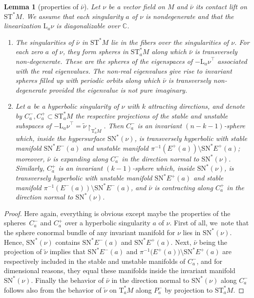 \documentclass[JEP,XML,SOM,Unicode]{cedram}
\newenvironment{enumeratea}
{\bgroup\def\theenumi{\alph{enumi}}\begin{enumerate}}
{\end{enumerate}\egroup}
\newcommand{\C}{{\mathbb C}}
\newcommand{\tu}[1]{\textup{#1}}
\newcommand{\sSN}{\mathrm{SN}^\ast}
\newcommand{\sT}{\mathrm{T}^\ast}
\newcommand{\sST}{\mathrm{ST}^\ast}
\newcommand{\hnu}{\tilde\nu}
\newcommand{\cnu}{\bar\nu}
\def\Lnu_#1{{\mathrm L_#1\nu}}
\newcommand{\rst}[1]{{\upharpoonright}_{\!#1}}
\theoremstyle{plain}
\newtheorem{lemma}[theorem]{Lemma}
\theoremstyle{definition}
\begin{document}
\begin{lemma}[properties of $\cnu$] \label{l:cnu}
Let $\nu$ be a vector field on $M$ and $\cnu$ its contact lift on $\sST M$. We
assume that each singularity $a$ of $\nu$ is nondegenerate and that the
linearization $\Lnu_a$ is diagonalizable over $\C$.
\begin{enumeratea}
\item\label{l:cnua}
The singularities of $\cnu$ in $\sST M$ lie in the fibers over the singularities
of $\nu$. For each zero $a$ of $\nu$, they form spheres in $\sST_aM$ along which
$\cnu$ is transversely non-degenerate. These are the spheres of the eigenspaces
of $-\Lnu_a^\top$ associated with the real eigenvalues. The non-real eigenvalues
give rise to invariant spheres filled up with periodic orbits along which $\cnu$
is transversely non-degenerate provided the eigenvalue is not pure imaginary.

\item\label{l:cnub}
Let $a$ be a hyperbolic singularity of $\nu$ with $k$ attracting directions, and
denote by $C_a^-,C_a^+ \subset \sST_aM$ the respective projections of the stable
and unstable subspaces of $-\Lnu_a^\top = \hnu \rst{ \sT_aM }$. Then $C_a^-$ is
an invariant $(n-k-1)$-sphere which, inside the hypersurface $\sSN(\nu)$, is
transversely hyperbolic with stable manifold $\sSN E^-(a)$ and unstable manifold
$\pi^{-1}(E^+(a)) \setminus \sSN E^+(a)$\tu; moreover, $\cnu$ is expanding along $C_a^-$
in the direction normal to $\sSN(\nu)$. Similarly, $C_a^+$ is an invariant
$(k-1)$-sphere which, inside $\sSN(\nu)$, is transversely hyperbolic with
unstable manifold $\sSN E^+(a)$ and stable manifold $\pi^{-1}(E^-(a)) \setminus\sSN
E^-(a)$, and $\cnu$ is contracting along $C_a^+$ in the direction normal to
$\sSN(\nu)$.
\end{enumeratea}
\end{lemma}

\begin{proof}
Here again, everything is obvious except maybe the properties of the spheres~$C_a^-$ and $C_a^+$ over a hyperbolic singularity $a$ of $\nu$. First of all, we~note that the sphere conormal bundle of any invariant manifold for $\nu$ lies in
$\sSN(\nu)$. Hence, $\sSN(\nu)$ contains $\sSN E^-(a)$ and $\sSN E^+(a)$. Next,
$\cnu$ being the projection of $\hnu$ implies that $\sSN E^-(a)$ and $\pi^{-1}
\bigl(E^+(a)\bigr) \setminus \sSN E^+(a)$ are respectively included in the stable and
unstable manifolds of $C_a^-$, and for dimensional reasons, they equal these
manifolds inside the invariant manifold $\sSN(\nu)$. Finally the behavior of
$\cnu$ in the direction normal to $\sSN(\nu)$ along $C_a^-$ follows also from
the behavior of $\hnu$ on $\sT_aM$ along $P_a^-$ by projection to $\sST_aM$.
\end{proof}
\end{document}
